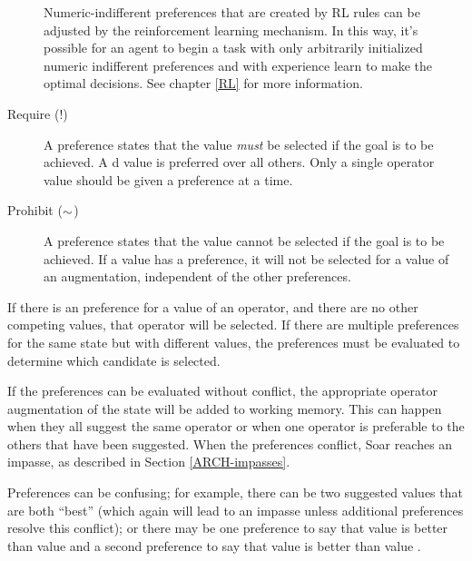 \begin{description}
	Numeric-indifferent preferences that are created by RL rules can be adjusted by the reinforcement learning mechanism. In this way, it's possible for an agent to begin a task with only arbitrarily initialized numeric indifferent preferences and with experience learn to make the optimal decisions. See chapter \ref{RL} for more information.

\item [Require (!)]
	A  preference states that the value \emph{must} be selected if the goal is to be achieved. A d value is preferred over all others. Only a single operator value should be given a  preference at a time.
\vspace{-8pt}

\item [Prohibit ($\sim$)]
	A  preference states that the value cannot be selected if the goal is to be achieved.  If a value has a  preference, it will not be selected for a value of an augmentation, independent of the other preferences.
\vspace{-8pt}
\end{description}


If there is an  preference for a value of an operator, and there are no other competing values, that operator will be selected. If there are multiple  preferences for the same state but with different values, the preferences must be evaluated to determine which candidate is selected.

If the preferences can be evaluated without conflict, the appropriate operator augmentation of the state will be added to working memory. This can happen when they all suggest the same operator or when one operator is preferable to the others that have been suggested. When the preferences conflict, Soar reaches an impasse, as described in Section \ref{ARCH-impasses}.

Preferences can be confusing; for example, there can be two suggested values that are both ``best'' (which again will lead to an impasse unless additional preferences resolve this conflict); or there may be one preference to say that value  is better than value  and a second preference to say that value  is better than value .

